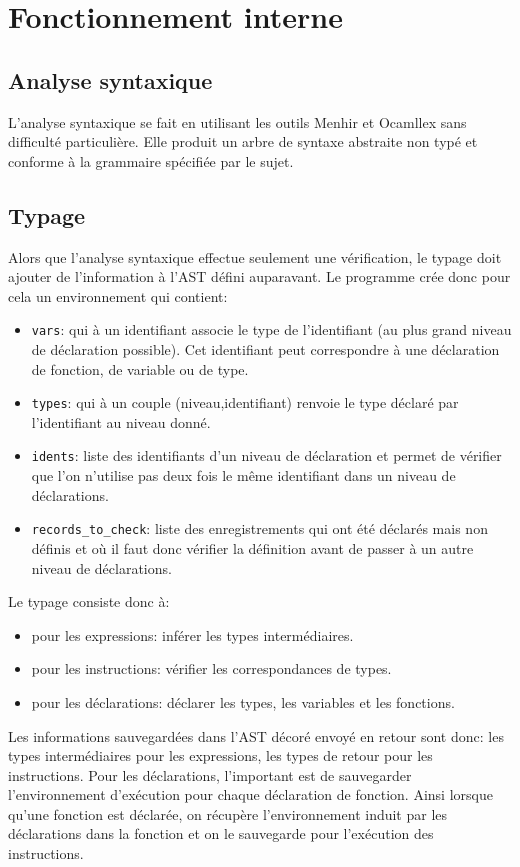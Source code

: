 \documentclass{article}
\begin{document}
  \section{Fonctionnement interne}
  \subsection{Analyse syntaxique}
  L'analyse syntaxique se fait en utilisant les outils Menhir et Ocamllex sans difficulté particulière.
  Elle produit un arbre de syntaxe abstraite non typé et conforme à la grammaire spécifiée par le sujet.
  \subsection{Typage}
  Alors que l'analyse syntaxique effectue seulement une vérification, le typage doit ajouter de l'information à l'AST défini auparavant.
  Le programme crée donc pour cela un environnement qui contient:
  \begin{itemize}
    \item \texttt{vars}: qui à un identifiant associe le type de l'identifiant (au plus grand niveau de déclaration possible). Cet identifiant peut correspondre à une déclaration de fonction, de variable ou de type.
    \item \texttt{types}: qui à un couple (niveau,identifiant) renvoie le type déclaré par l'identifiant au niveau donné.
    \item \texttt{idents}: liste des identifiants d'un niveau de déclaration et permet de vérifier que l'on n'utilise pas deux fois le même identifiant dans un niveau de déclarations.
    \item \texttt{records\_to\_check}: liste des enregistrements qui ont été déclarés mais non définis et où il faut donc vérifier la définition avant de passer à un autre niveau de déclarations.
  \end{itemize}
  Le typage consiste donc à:
  \begin{itemize}
    \item pour les expressions: inférer les types intermédiaires.
    \item pour les instructions: vérifier les correspondances de types.
    \item pour les déclarations: déclarer les types, les variables et les fonctions.
  \end{itemize}

  Les informations sauvegardées dans l'AST décoré envoyé en retour sont donc: les types intermédiaires pour les expressions, les types de retour pour les instructions.
  Pour les déclarations, l'important est de sauvegarder l'environnement d'exécution pour chaque déclaration de fonction.
  Ainsi lorsque qu'une fonction est déclarée, on récupère l'environnement induit par les déclarations dans la fonction et on le sauvegarde pour l'exécution des instructions.
\end{document}
